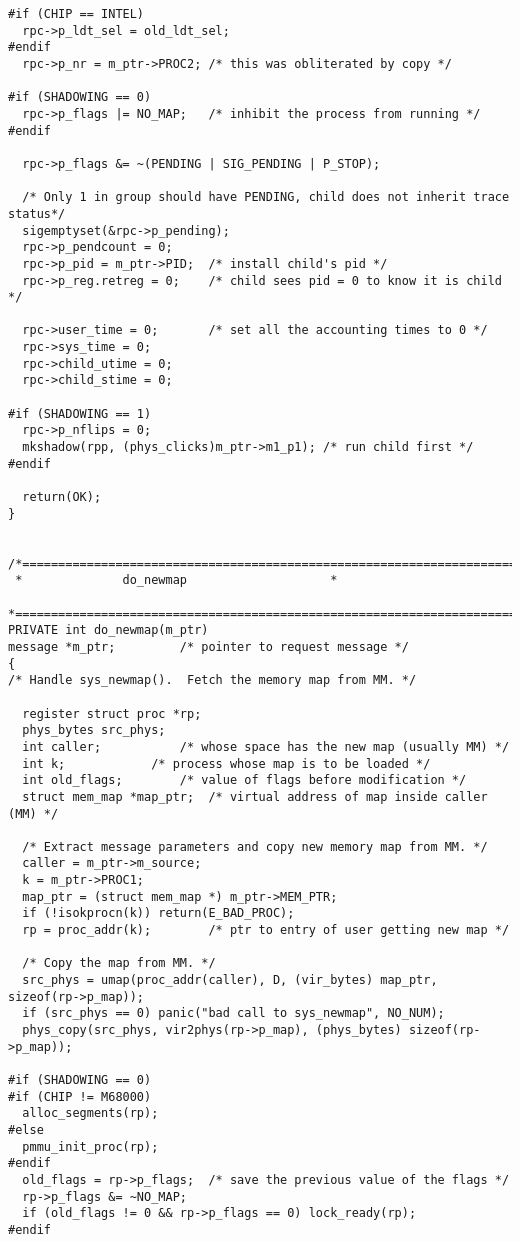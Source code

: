 \begin{verbatim}
#if (CHIP == INTEL)
  rpc->p_ldt_sel = old_ldt_sel;
#endif
  rpc->p_nr = m_ptr->PROC2;	/* this was obliterated by copy */

#if (SHADOWING == 0)
  rpc->p_flags |= NO_MAP;	/* inhibit the process from running */
#endif

  rpc->p_flags &= ~(PENDING | SIG_PENDING | P_STOP);

  /* Only 1 in group should have PENDING, child does not inherit trace status*/
  sigemptyset(&rpc->p_pending);
  rpc->p_pendcount = 0;
  rpc->p_pid = m_ptr->PID;	/* install child's pid */
  rpc->p_reg.retreg = 0;	/* child sees pid = 0 to know it is child */

  rpc->user_time = 0;		/* set all the accounting times to 0 */
  rpc->sys_time = 0;
  rpc->child_utime = 0;
  rpc->child_stime = 0;

#if (SHADOWING == 1)
  rpc->p_nflips = 0;
  mkshadow(rpp, (phys_clicks)m_ptr->m1_p1);	/* run child first */
#endif

  return(OK);
}


/*===========================================================================*
 *				do_newmap				     *
 *===========================================================================*/
PRIVATE int do_newmap(m_ptr)
message *m_ptr;			/* pointer to request message */
{
/* Handle sys_newmap().  Fetch the memory map from MM. */

  register struct proc *rp;
  phys_bytes src_phys;
  int caller;			/* whose space has the new map (usually MM) */
  int k;			/* process whose map is to be loaded */
  int old_flags;		/* value of flags before modification */
  struct mem_map *map_ptr;	/* virtual address of map inside caller (MM) */

  /* Extract message parameters and copy new memory map from MM. */
  caller = m_ptr->m_source;
  k = m_ptr->PROC1;
  map_ptr = (struct mem_map *) m_ptr->MEM_PTR;
  if (!isokprocn(k)) return(E_BAD_PROC);
  rp = proc_addr(k);		/* ptr to entry of user getting new map */

  /* Copy the map from MM. */
  src_phys = umap(proc_addr(caller), D, (vir_bytes) map_ptr, sizeof(rp->p_map));
  if (src_phys == 0) panic("bad call to sys_newmap", NO_NUM);
  phys_copy(src_phys, vir2phys(rp->p_map), (phys_bytes) sizeof(rp->p_map));

#if (SHADOWING == 0)
#if (CHIP != M68000)
  alloc_segments(rp);
#else
  pmmu_init_proc(rp);
#endif
  old_flags = rp->p_flags;	/* save the previous value of the flags */
  rp->p_flags &= ~NO_MAP;
  if (old_flags != 0 && rp->p_flags == 0) lock_ready(rp);
#endif


\end{verbatim}
